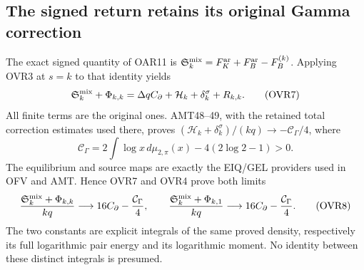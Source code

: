 \documentclass[11pt,a4paper]{article}
\begin{document}
\subsection{The signed return retains its original Gamma correction}
The exact signed quantity of OAR11 is
$\mathfrak S_k^{\rm mix}=F_K^{\rm ar}+F_B^{\rm ar}-F_B^{(k)}$.
Applying OVR3 at $s=k$ to that identity yields
\[
 \mathfrak S_k^{\rm mix}+\Phi_{k,k}
     =\Delta q C_\partial+\mathcal H_k+\delta_k^\sigma+R_{k,k}.
 \tag{OVR7}
\]
All finite terms are the original ones. AMT48--49, with the retained
total correction estimates used there, proves
$(\mathcal H_k+\delta_k^\sigma)/(kq)\to-\mathcal C_\Gamma/4$,
where
\[
 \mathcal C_\Gamma
   =2\int\log x\,d\mu_{2,\pi}(x)-4(2\log2-1)>0.
\]
The equilibrium and source maps are exactly the EIQ/GEL providers
used in OFV and AMT. Hence OVR7 and OVR4 prove both limits
\[
 \frac{\mathfrak S_k^{\rm mix}+\Phi_{k,k}}{kq}
       \longrightarrow16C_\partial-\frac{\mathcal C_\Gamma}{4},
 \qquad
 \frac{\mathfrak S_k^{\rm mix}+\Phi_{k,1}}{kq}
       \longrightarrow16C_\partial-\frac{\mathcal C_\Gamma}{4}.
 \tag{OVR8}
\]
The two constants are explicit integrals of the same proved density,
respectively its full logarithmic pair energy and its logarithmic
moment. No identity between these distinct integrals is presumed.
\end{document}
